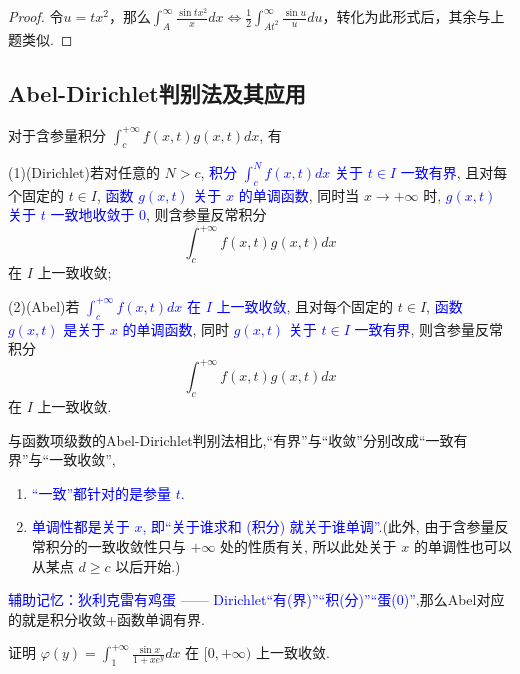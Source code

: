 \documentclass[lang=cn,newtx,10pt,scheme=chinese]{elegantbook}
\begin{document}
\begin{proof}
    令$u=tx^2$，那么$\int_{A}^{\infty} \frac{\sin t x^2}{x}dx \iff \frac{1}{2}\int_{At^2}^{\infty}\frac{\sin u}{u}du$，转化为此形式后，其余与上题类似.
\end{proof}
\subsection{Abel-Dirichlet判别法及其应用}

\begin{theorem}
对于含参量积分 $\int_{c}^{+\infty} f(x,t) g(x,t) dx$, 有

(1)(Dirichlet)若对任意的 $N > c$, \textcolor{blue}{积分 $\int_{c}^{N} f(x,t) dx$ 关于 $t \in I$ 一致有界}, 且对每个固定的 $t \in I$, \textcolor{blue}{函数 $g(x,t)$ 关于 $x$ 的单调函数}, 同时当 $x \to +\infty$ 时, \textcolor{blue}{$g(x,t)$ 关于 $t$ 一致地收敛于 0}, 则含参量反常积分
$$ \int_{c}^{+\infty} f(x,t) g(x,t) dx $$
在 $I$ 上一致收敛;

(2)(Abel)若 \textcolor{blue}{$\int_{c}^{+\infty} f(x,t) dx$ 在 $I$ 上一致收敛}, 且对每个固定的 $t \in I$, \textcolor{blue}{函数 $g(x,t)$ 是关于 $x$ 的单调函数}, 同时 \textcolor{blue}{$g(x,t)$ 关于 $t \in I$ 一致有界}, 则含参量反常积分
$$ \int_{c}^{+\infty} f(x,t) g(x,t) dx $$
在 $I$ 上一致收敛.
\end{theorem}

\begin{remark}
    与函数项级数的Abel-Dirichlet判别法相比,“有界”与“收敛”分别改成“一致有界”与“一致收敛”,
    \begin{enumerate}
        \item \textcolor{blue}{“一致”都针对的是参量 $t$. }
        \item \textcolor{blue}{单调性都是关于 $x$, 即“关于谁求和 (积分) 就关于谁单调”.}(此外, 由于含参量反常积分的一致收敛性只与 $+\infty$ 处的性质有关, 所以此处关于 $x$ 的单调性也可以从某点 $d \ge c$ 以后开始.)
    \end{enumerate}
\end{remark}

\begin{note}
    \textcolor{blue}{辅助记忆：狄利克雷有鸡蛋 —— Dirichlet“有(界)”“积(分)”“蛋(0)”},那么Abel对应的就是积分收敛+函数单调有界.
\end{note}

\begin{example}
证明 $\varphi(y) = \int_{1}^{+\infty} \frac{\sin x}{1 + x e^y} dx$ 在 $[0, +\infty)$ 上一致收敛.
\end{example}
\end{document}
